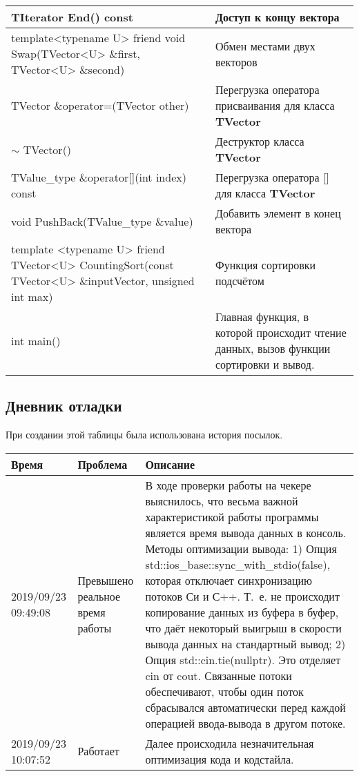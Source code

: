 \documentclass[12pt]{article}
\begin{document}
\begin{table}[!htb]
\begin{tabular}{|m{8cm}|m{8cm}|}
\hline
TIterator End() const & Доступ к концу вектора \\
\hline
template<typename U> friend void Swap(TVector<U> \&first, TVector<U> \&second) & Обмен местами двух векторов\\
\hline
TVector \&operator=(TVector other) & Перегрузка оператора присваивания для класса \textbf{TVector}\\
\hline
$\sim$ TVector() & Деструктор класса \textbf{TVector} \\
\hline
TValue\_type \&operator[](int index) const & Перегрузка оператора [] для класса \textbf{TVector}\\
\hline
void PushBack(TValue\_type \&value) & Добавить элемент в конец вектора\\
\hline
template <typename U> friend TVector<U> CountingSort(const TVector<U> \&inputVector, unsigned int max) & Функция сортировки подсчётом\\
\hline
int main() & Главная функция, в которой происходит чтение данных, вызов функции сортировки и вывод. \\
\hline
\end{tabular}
\end{table}

\subsection*{Дневник отладки}

При создании этой таблицы была использована история посылок.
\begin{table}[!htb]
\begin{tabular}{|m{2cm}|m{3cm}|m{11cm}|}
\hline
Время & Проблема & Описание \\
\hline
2019/09/23 09:49:08 & Превышено реальное время работы & В ходе проверки работы на чекере выяснилось, что весьма важной характеристикой работы программы является время вывода данных в консоль. Методы оптимизации вывода: 1) Опция std::ios\_base::sync\_with\_stdio(false), которая отключает синхронизацию потоков Си и С++. Т.~е. не происходит копирование данных из буфера в буфер, что даёт некоторый выигрыш в скорости вывода данных на стандартный вывод; 2) Опция std::cin.tie(nullptr). Это отделяет cin от cout. Связанные потоки обеспечивают, чтобы один поток сбрасывался автоматически перед каждой операцией ввода-вывода в другом потоке. \\
\hline
2019/09/23 10:07:52 & Работает & Далее происходила незначительная оптимизация кода и кодстайла. \\
\hline
\end{tabular}
\end{table}
\end{document}
